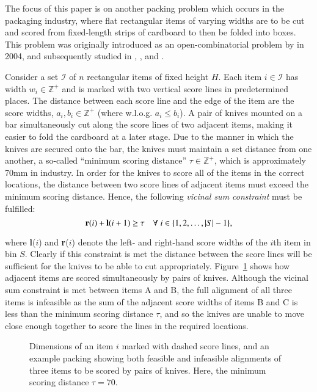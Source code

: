\documentclass[authoryear]{elsarticle}
\begin{document}
The focus of this paper is on another packing problem which occurs in the packaging industry, where flat rectangular items of varying widths are to be cut and scored from fixed-length strips of cardboard to then be folded into boxes. This problem was originally introduced as an open-combinatorial problem by \citeauthor{goulimis2004} in 2004, and subsequently studied in \citet{lewis2011}, \citet{becker2015}, and \citet{hawa2018}.

Consider a set $\mathcal{I}$ of $n$ rectangular items of fixed height $H$. Each item $i \in \mathcal{I}$ has width $w_i \in \mathbb{Z}^+$ and is marked with two vertical score lines in predetermined places. The distance between each score line and the edge of the item are the score widths, $a_i, b_i \in \mathbb{Z}^+$ (where w.l.o.g. $a_i \leq b_i$). A pair of knives mounted on a bar simultaneously cut along the score lines of two adjacent items, making it easier to fold the cardboard at a later stage. Due to the manner in which the knives are secured onto the bar, the knives must maintain a set distance from one another, a so-called ``minimum scoring distance'' $\tau \in \mathbb{Z}^+$, which is approximately 70mm in industry. In order for the knives to score all of the items in the correct locations, the distance between two score lines of adjacent items must exceed the minimum scoring distance. Hence, the following \emph{vicinal sum constraint} must be fulfilled:
\begin{equation}
	\textbf{r}(i) + \textbf{l}(i+1) \geq \tau \quad \forall \hspace{1mm} i \in \{1,2,\dotsc,|S|- 1\},
	\label{eqn:vsc}
\end{equation}

\noindent where \textbf{l}($i$) and \textbf{r}($i$) denote the left- and right-hand score widths of the $i$th item in bin $S$. Clearly if this constraint is met the distance between the score lines will be sufficient for the knives to be able to cut appropriately. Figure~\ref{fig:itemsknife} shows how adjacent items are scored simultaneously by pairs of knives. Although the vicinal sum constraint is met between items A and B, the full alignment of all three items is infeasible as the sum of the adjacent score widths of items B and C is less than the minimum scoring distance $\tau$, and so the knives are unable to move close enough together to score the lines in the required locations.
\begin{figure}[H]	
	\centering
	
	\caption{Dimensions of an item $i$ marked with dashed score lines, and an example packing showing both feasible and infeasible alignments of three items to be scored by pairs of knives. Here, the minimum scoring distance $\tau = 70$.}	
	\label{fig:itemsknife}
\end{figure}
\end{document}
